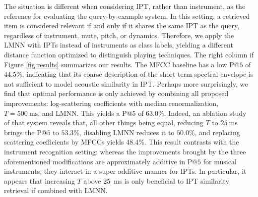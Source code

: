 The situation is different when considering IPT, rather than instrument, as the reference for evaluating the query-by-example system.
In this setting, a retrieved item is considered relevant if and only if it shares the same IPT as the query, regardless of instrument, mute, pitch, or dynamics.
Therefore, we apply the LMNN with IPTs instead of instruments as class labels, yielding a different distance function optimized to distinguish playing techniques.
The right column if Figure \ref{fig:results} summarizes our results.
The MFCC baseline has a low P@$5$ of $44.5\%$, indicating that its coarse description of the short-term spectral envelope is not sufficient to model acoustic similarity in IPT.
Perhaps more surprisingly, we find that optimal performance is only achieved by combining all proposed improvements: log-scattering coefficients with median renormalization, $T=\SI{500}{\milli\second}$, and LMNN.
This yields a P@$5$ of $63.0\%$.
Indeed, an ablation study of that system reveals that, all other things being equal, reducing $T$ to $\SI{25}{\milli\second}$ brings the P@$5$ to $53.3\%$, disabling LMNN reduces it to $50.0\%$, and replacing scattering coefficients by MFCCs yields $48.4\%$.
This result contrasts with the instrument recognition setting: whereas the improvements brought by the three aforementioned modifications are approximately additive in P@$5$ for musical instruments, they interact in a super-additive manner for IPTs.
In particular, it appears that increasing $T$ above \SI{25}{\milli\second} is only beneficial to IPT similarity retrieval if combined with LMNN.


